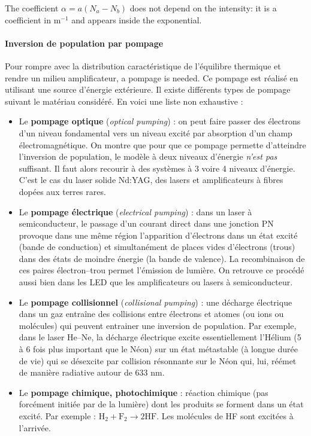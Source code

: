 \begin{remark}
  The coefficient $\alpha=a(N_a-N_b)$ does not depend on the intensity: it is a
  coefficient in m$^{-1}$ and appears inside the exponential.
\end{remark}

\paragraph{Inversion de population par pompage}
Pour rompre avec la distribution caractéristique de l'équilibre thermique et
rendre un milieu amplificateur, a pompage is needed. Ce pompage est réalisé en
utilisant une source d'énergie extérieure. Il existe différents types de
pompage suivant le matériau considéré. En voici une liste non exhaustive :

\begin{itemize}
  \item Le \textbf{pompage optique} (\textit{optical pumping}) : on peut faire
    passer des électrons d'un niveau fondamental vers un niveau excité par
    absorption d'un champ électromagnétique. On montre que pour que ce pompage
    permette d'atteindre l'inversion de population, le modèle à deux niveaux
    d'énergie \emph{n'est pas} suffisant. Il faut alors recourir à des systèmes
    à 3 voire 4 niveaux d'énergie. C'est le cas du laser solide Nd:YAG, des
    lasers et amplificateurs à fibres dopées aux terres rares.
  \item Le \textbf{pompage électrique} (\textit{electrical pumping}) : dans un
    laser à semiconducteur, le passage d'un courant direct dans une jonction PN
    provoque dans une même région l'apparition d'électrons dans un état excité
    (bande de conduction) et simultanément de places vides d'électrons (trous)
    dans des états de moindre énergie (la bande de valence). La recombinaison de
    ces paires électron--trou permet l'émission de lumière. On retrouve ce
    procédé aussi bien dans les LED que les amplificateurs ou lasers à
    semiconducteur.
  \item Le \textbf{pompage collisionnel} (\textit{collisional pumping}) : une
    décharge électrique dans un gaz entraîne des collisions entre électrons et
    atomes (ou ions ou molécules) qui peuvent entrainer une inversion de
    population. Par exemple, dans le laser He--Ne, la décharge électrique excite
    essentiellement l'Hélium (5 à 6 fois plus important que le Néon) sur un
    état métastable (à longue durée de vie) qui se désexcite par collision
    résonnante sur le Néon qui, lui, réémet de manière radiative autour de
    633 nm.
  \item Le \textbf{pompage chimique, photochimique} : réaction chimique (pas
    forcément initiée par de la lumière) dont les produits se forment dans un
    état excité. Par exemple : $\mathrm{H_2+F_2\to 2HF}$. Les molécules de HF
    sont excitées à l'arrivée.
\end{itemize}

